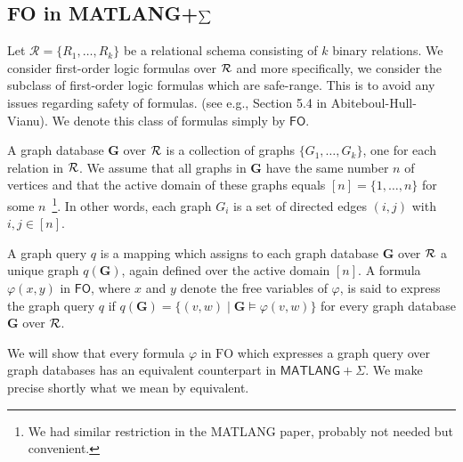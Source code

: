 \subsection{FO in MATLANG+$\textstyle\sum$}

Let $\mathcal{R}=\{R_1,\ldots,R_k\}$ be a relational schema consisting of $k$ binary relations. We consider first-order logic formulas  over ${\cal R}$ and more specifically, we consider the subclass of first-order logic formulas which are safe-range. This is to avoid any issues regarding safety of formulas. (see e.g., Section 5.4 in Abiteboul-Hull-Vianu). We denote this class of formulas simply by $\textsf{FO}$. 

A graph database $\mathbf{G}$ over ${\cal R}$ is a collection of graphs $\{G_1,\ldots,G_k\}$, one for each relation in ${\cal R}$. 
We assume that all graphs in $\mathbf{G}$ have the same number $n$ of vertices and that the active domain of these graphs equals $[n]=\{1,\ldots,n\}$ for some $n$~\footnote{We had similar restriction in the MATLANG paper, probably not needed but convenient.}. In other words, each graph $G_i$ is a set of directed edges $(i,j)$ with $i,j\in [n]$.

A graph query $q$ is a mapping which assigns to each graph database
$\mathbf{G}$ over ${\cal R}$ a unique graph $q(\mathbf{G})$, again defined over the active domain $[n]$.  A formula $\varphi(x,y)$ in $\textsf{FO}$, where $x$ and $y$ denote the free variables of $\varphi$, is said to express the graph query $q$ if $q(\mathbf{G})=\{(v,w) \mid \mathbf{G}\models\varphi(v,w)\}$
for every graph database $\mathbf{G}$ over ${\cal R}$.

We will show that every formula $\varphi$ in $\text{FO}$ which expresses a graph query over graph databases  has an equivalent counterpart in $\textsf{MATLANG}+\Sigma$. We make precise shortly what we mean by equivalent.

